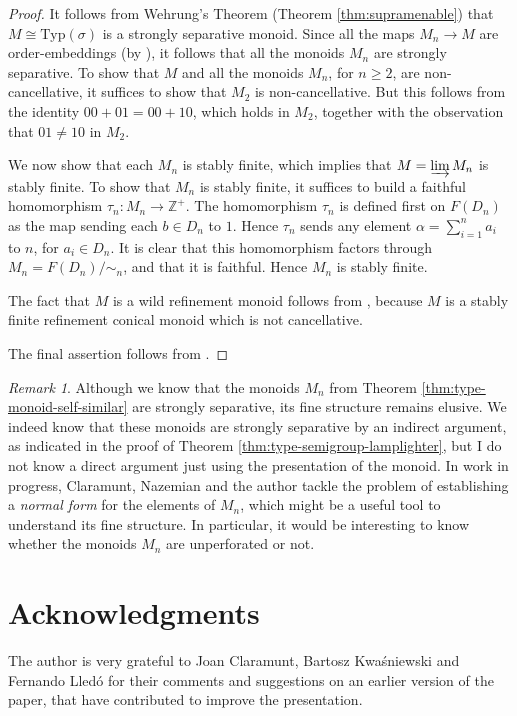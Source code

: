 \documentclass[11pt]{amsart}
\theoremstyle{plain}            %
\theoremstyle{definition}       %
\theoremstyle{definition}       %
\theoremstyle{remark}
\newtheorem{remark}[theorem]{Remark}
\newcommand{\Typ}{\mathrm{Typ}}
\def\Z{\mathbb{Z}}
\begin{document}
\begin{proof}
It follows from Wehrung's Theorem (Theorem \ref{thm:supramenable}) that $M\cong \Typ (\sigma)$ is a strongly separative monoid. Since all the maps $M_n\to M$ are order-embeddings (by \cite[Lemma 4.5]{ae14}), it follows that all the monoids $M_n$ are strongly separative. To show that $M$ and all the monoids $M_n$, for $n\ge 2$, are non-cancellative, it suffices to show that $M_2$ is non-cancellative. But this follows from the identity $00+01 = 00+10$, which holds in $M_2$, together with the observation that $01\ne 10$ in $M_2$.

We now show that each $M_n$ is stably finite, which implies that $M= \varinjlim M_n$ is stably finite. 
To show that $M_n$ is stably finite, it suffices to build a faithful homomorphism $\tau_n \colon M_n \to \Z^+$. The homomorphism
$\tau_n $ is defined first on $F(D_n)$ as the map sending each $b\in D_n$ to $1$. Hence $\tau_n$ sends any element
$\alpha = \sum_{i=1}^n a_i$ to $n$, for $a_i\in D_n$. It is clear that this homomorphism factors through $M_n=F(D_n)/{\sim_n}$, and that it is faithful. Hence $M_n$ is stably finite.

The fact that $M$ is a wild refinement monoid follows from \cite[Theorem 3.14]{ag15}, because $M$ is a stably finite refinement conical monoid which is not cancellative.

The final assertion follows from \cite[Corollary 5.9 and Example 9.7]{ae14}.
\end{proof}

\begin{remark}
\label{rem:work-in-progress}
Although we know that the monoids $M_n$ from Theorem \ref{thm:type-monoid-self-similar} are strongly separative, its fine structure remains elusive. We indeed know that these monoids are strongly separative by an indirect argument, as indicated in the proof of Theorem \ref{thm:type-semigroup-lamplighter}, but I do not know a direct argument just using the presentation of the monoid.
In work in progress, Claramunt, Nazemian and the author tackle the problem of establishing a {\it normal form} for the elements of
$M_n$, which might be a useful tool to understand its fine structure. In particular, it would be interesting to know whether the monoids $M_n$ are unperforated or not.
\end{remark}

\section*{Acknowledgments}{The author is very grateful to Joan Claramunt, Bartosz Kwaśniewski and Fernando Lledó for their comments and suggestions on an earlier version of the paper, that have contributed to improve the presentation.} 
\end{document}
